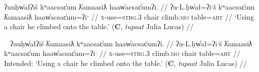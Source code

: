 \ex \label{ex:usechairclimb}
\begingl
\glpreamble ʔuuḥw̓ałʔiš kʷaacsac̓um ƛ̓amaasiƛ haaw̓acsac̓umʔi. //
\gla ʔu-L.ḥw̓ał=ʔiˑš kʷaacsac̓um ƛ̓amaasiƛ haaw̓acsac̓um=ʔiˑ //
\glb \textsc{x}-use=\textsc{strg.3} chair climb.\textsc{mo} table=\textsc{art} //
\glft `Using a chair he climbed onto the table.' (\textbf{C}, \textit{tupaat} Julia Lucas) //
\endgl
\xe

\ex~ \label{ex:*usechairclimb}
\begingl
\glpreamble *ʔuuḥw̓ałʔiš ƛ̓amaasiƛ kʷaacsac̓um haaw̓acsac̓umʔi. //
\gla ʔu-L.ḥw̓ał=ʔiˑš ƛ̓amaasiƛ kʷaacsac̓um haaw̓acsac̓um=ʔiˑ //
\glb \textsc{x}-use=\textsc{strg.3} climb.\textsc{mo} chair table=\textsc{art} //
\glft Intended: `Using a chair he climbed onto the table.' (\textbf{C}, \textit{tupaat} Julia Lucas) //
\endgl
\xe






\begin{comment}
Something similar happened with Sophie Billy. Sentence () is from a translation text she has been working on, and I asked about rephrases () and (). While I was interpreting () as manner and action (Type I), I think she, in the context of the story, saw them as sequential (Type V): lead and then bring back. In this context, the reordering of () is nonsense: One cannot bring someone back and then lead them.

\ex \label{ex:leadbringback}
\begingl
\glpreamble m̓aw̓aaƛint ḥaaw̓iłƛisi huʔacap̓ƛ. //
\gla m̓aw̓aa=!aƛ=int ḥaaw̓iłƛ=ʔis=ʔiˑ huʔa-ci-!ap=!aƛ //
\glb lead=\textsc{now}=\textsc{pst} young.man=\textsc{dim}=\textsc{art} back-go=\textsc{caus}\textsc{now} //
\glft `She led the young man and took him back.' (\textbf{Q}, Sophie Billy) //
\endgl
\xe

NB: This is due to obj-verb ordering of ex. 3
BM
yaacukw̓it̓asaḥ waałak c̓uumaʕas
*yaacukw̓it̓asaḥ c̓uumaʕas
*yaacukw̓it̓asaḥ c̓uumaʕas waałak


NB: This may be due to the !aƛ forcing a two-sentence interpretation
SB
m̓aw̓aaƛint ḥaaw̓iłƛisi huʔacap̓ƛ
m̓aw̓aaƛint huʔacap̓ƛ ḥaaw̓iłƛisi
*huʔacap̓ƛint m̓aw̓aaƛ ḥaaw̓iłƛisi 
\end{comment}

